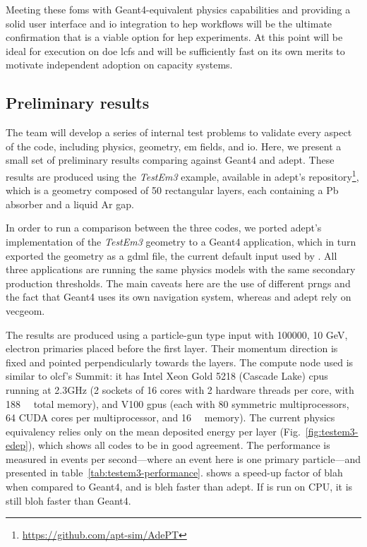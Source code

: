 Meeting these \acp{fom} with Geant4-equivalent physics capabilities and
providing a solid user interface and \ac{io} integration to \ac{hep} workflows
will be the ultimate confirmation that \celeritas is a viable option for
\ac{hep} experiments. At this point \celeritas will be ideal for execution on
\ac{doe} \acp{lcf} and will be sufficiently fast on its own merits to motivate
independent adoption on capacity systems.

\subsection{Preliminary results}

The \celeritas team will develop a series of internal test problems to validate
every aspect of the code, including physics, geometry, \ac{em} fields, and
\ac{io}. Here, we present a small set of preliminary results comparing
\celeritas against Geant4 and \acs{adept}. These results are produced using the
\emph{TestEm3} example, available in \acs{adept}'s repository\footnote {
    \url{https://github.com/apt-sim/AdePT}
},
which is a geometry composed of 50 rectangular layers, each containing a Pb
absorber and a liquid Ar gap.

In order to run a comparison between the three codes, we ported \acs{adept}'s
implementation of the \emph{TestEm3} geometry to a Geant4 application, which in
turn exported the geometry as a \acs{gdml} file, the current default input used
by \celeritas. All three applications are running the same physics models with
the same secondary production thresholds. The main caveats here are the use of
different \acp{prng} and the fact that Geant4 uses its own navigation system,
whereas \celeritas and \acs{adept} rely on \acs{vecgeom}.

The results are produced using a particle-gun type input with \num{100000}, 10
GeV, electron primaries placed before the first layer. Their momentum direction
is fixed and pointed perpendicularly towards the layers. The compute node used
is similar to \ac{olcf}'s Summit: it has Intel Xeon Gold 5218 (Cascade Lake)
\acp{cpu} running at 2.3GHz (2 sockets of 16 cores with 2 hardware threads per
core, with \SI{188}{\giga\byte} total memory), and \nvidia V100 \acp{gpu} (each
with 80 symmetric multiprocessors, 64 CUDA cores per multiprocessor, and
\SI{16}{\giga\byte} memory). The current physics equivalency relies only on the
mean deposited energy per layer (Fig.~\ref{fig:testem3-edep}), which shows all
codes to be in good agreement. The performance is measured in events per
second---where an event here is one primary particle---and presented in
table~\ref{tab:testem3-performance}. \celeritas shows a speed-up factor of blah
when compared to Geant4, and is bleh faster than \acs{adept}. If \celeritas is
run on CPU, it is still bloh faster than Geant4.


